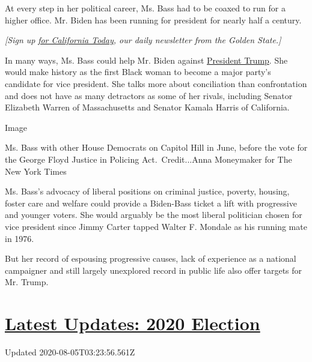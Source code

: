 At every step in her political career, Ms. Bass had to be coaxed to run
for a higher office. Mr. Biden has been running for president for nearly
half a century.

\emph{{[}Sign up}
\href{https://www.nytimes.com/newsletters/california-today}{\emph{for
California Today}}\emph{, our daily newsletter from the Golden
State.{]}}

In many ways, Ms. Bass could help Mr. Biden against
\href{https://www.nytimes.com/interactive/2020/us/elections/donald-trump.html}{President
Trump}. She would make history as the first Black woman to become a
major party's candidate for vice president. She talks more about
conciliation than confrontation and does not have as many detractors as
some of her rivals, including Senator Elizabeth Warren of Massachusetts
and Senator Kamala Harris of California.

Image

Ms. Bass with other House Democrats on Capitol Hill in June, before the
vote for the George Floyd Justice in Policing Act.~Credit...Anna
Moneymaker for The New York Times

Ms. Bass's advocacy of liberal positions on criminal justice, poverty,
housing, foster care and welfare could provide a Biden-Bass ticket a
lift with progressive and younger voters. She would arguably be the most
liberal politician chosen for vice president since Jimmy Carter tapped
Walter F. Mondale as his running mate in 1976.

But her record of espousing progressive causes, lack of experience as a
national campaigner and still largely unexplored record in public life
also offer targets for Mr. Trump.

\hypertarget{latest-updates-2020-election}{%
\section{\texorpdfstring{\href{https://www.nytimes.com/2020/08/04/us/elections/primary-election-michigan-arizona-kansas.html?action=click\&pgtype=Article\&state=default\&region=MAIN_CONTENT_1\&context=storylines_live_updates}{Latest
Updates: 2020
Election}}{Latest Updates: 2020 Election}}\label{latest-updates-2020-election}}

Updated 2020-08-05T03:23:56.561Z

